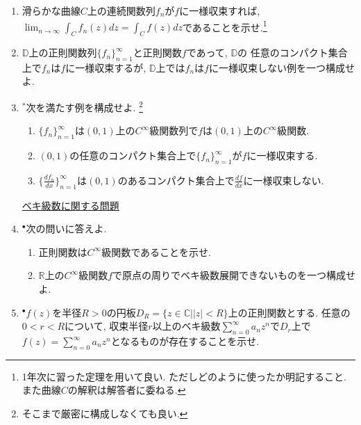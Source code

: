 \documentclass[dvipdfmx,a4paper,11pt]{article}
\newcommand{\R}{\mathbb{R}}
\newcommand{\C}{\mathbb{C}}
\newcommand{\D}{\mathbb{D}}
\theoremstyle{definition}
\newcommand{\drv}[2]{\frac{d #1}{d#2}}
\begin{document}
\begin{enumerate}[label=\textbf{問}3.\arabic*]

\item 滑らかな曲線$C$上の連続関数列$f_n$が$f$に一様収束すれば,
$\lim_{n\rightarrow \infty} \int_{C}f_n(z) dz = \int_{C} f(z) dz$であることを示せ.\footnote{1年次に習った定理を用いて良い. ただしどのように使ったか明記すること. また曲線$C$の解釈は解答者に委ねる. }
\item 
$\D$上の正則関数列$\{ f_{n}\}_{n=1}^{\infty}$と正則関数$f$であって, $\D$の
任意のコンパクト集合上で$f_n$は$f$に一様収束するが, $\D$上では$f_n$は$f$に一様収束しない例を一つ構成せよ. 


\item $^{*}$次を満たす例を構成せよ. \footnote{そこまで厳密に構成しなくても良い.}
 \begin{enumerate}
\setlength{\parskip}{0cm} 
  \setlength{\itemsep}{0cm} 
\item $\{ f_{n}\}_{n=1}^{\infty}$は$(0,1)$上の$C^{\infty}$級関数列で$f$は$(0,1)$上の$C^{\infty}$級関数.
\item $(0,1)$の任意のコンパクト集合上で$\{ f_{n}\}_{n=1}^{\infty}$が$f$に一様収束する.
\item $\{ \drv{f_{n}}{x}\}_{n=1}^{\infty}$は$(0,1)$のあるコンパクト集合上で$\drv{f}{x}$に一様収束しない.
\end{enumerate}

 \vspace{12pt}
\hspace{-36pt}\underline{ベキ級数に関する問題}

\item $^{\bullet}$次の問いに答えよ.
 \begin{enumerate}
\setlength{\parskip}{0cm} 
  \setlength{\itemsep}{0cm} 
\item 正則関数は$C^{\infty}$級関数であることを示せ.
\item $\R$上の$C^{\infty}$級関数$f$で原点の周りでベキ級数展開できないものを一つ構成せよ. 
\end{enumerate}

\item $^{\bullet}$$f(z) $を半径$R>0$の円板$D_{R} = \{ z \in \C | |z|<R\}$上の正則関数とする. 任意の$0 < r < R$について, 収束半径$r$以上のベキ級数$\sum_{n=0}^{\infty} a_n z^n$で$D_{r}$上で$f(z) = \sum_{n=0}^{\infty} a_n z^n$となるものが存在することを示せ. 


\end{enumerate}
\end{document}
